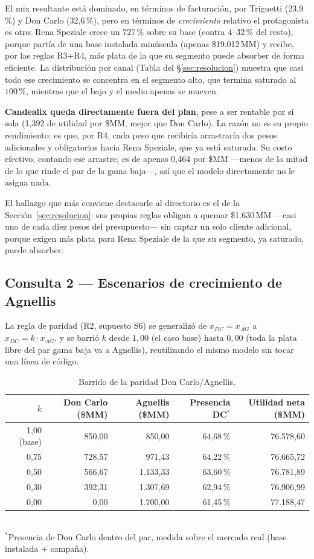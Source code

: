 \documentclass[10pt,a4paper]{article}
\begin{document}
El mix resultante está dominado, en términos de facturación, por Triguetti
(23,9\,\%) y Don Carlo (32,6\,\%), pero en términos de \emph{crecimiento}
relativo el protagonista es otro: Rena Speziale crece un $727\,\%$ sobre su
base (contra $4$--$32\,\%$ del resto), porque partía de una base instalada
minúscula (apenas \$19.012\,MM) y recibe, por las reglas R3+R4, más plata de
la que su segmento puede absorber de forma eficiente. La distribución por
canal (Tabla del \S\ref{sec:resolucion}) muestra que casi todo ese crecimiento
se concentra en el segmento alto, que termina saturado al $100\,\%$, mientras
que el bajo y el medio apenas se mueven.

\textbf{Candealix queda directamente fuera del plan}, pese a ser rentable por
sí sola (1,392 de utilidad por \$MM, mejor que Don Carlo). La razón no es su
propio rendimiento: es que, por R4, cada peso que recibiría arrastraría dos
pesos adicionales y obligatorios hacia Rena Speziale, que ya está saturada.
Su costo efectivo, contando ese arrastre, es de apenas 0,464 por \$MM —menos
de la mitad de lo que rinde el par de la gama baja—, así que el modelo
directamente no le asigna nada.

El hallazgo que más conviene destacarle al directorio es el de la
Sección~\ref{sec:resolucion}: sus propias reglas obligan a quemar
\$1.630\,MM —casi uno de cada diez pesos del presupuesto— sin captar un solo
cliente adicional, porque exigen más plata para Rena Speziale de la que su
segmento, ya saturado, puede absorber.

\subsection{Consulta 2 — Escenarios de crecimiento de Agnellis}
\label{sec:consulta2}

La regla de paridad (R2, supuesto S6) se generalizó de $x_{DC}=x_{AG}$ a
$x_{DC}=k\cdot x_{AG}$, y se barrió $k$ desde $1{,}00$ (el caso base) hasta
$0{,}00$ (toda la plata libre del par gama baja va a Agnellis), reutilizando
el mismo modelo sin tocar una línea de código.

\begin{table}[htbp]
\centering\small
\caption{Barrido de la paridad Don Carlo/Agnellis.}
\begin{tabular}{rrrrr}
\toprule
$k$ & Don Carlo (\$MM) & Agnellis (\$MM) & Presencia DC$^{*}$ & Utilidad neta (\$MM) \\
\midrule
1,00 (base) & 850,00 & 850,00   & 64{,}68\,\% & 76.578,60 \\
0,75        & 728,57 & 971,43   & 64{,}22\,\% & 76.665,72 \\
0,50        & 566,67 & 1.133,33 & 63{,}60\,\% & 76.781,89 \\
0,30        & 392,31 & 1.307,69 & 62{,}94\,\% & 76.906,99 \\
0,00        & 0,00   & 1.700,00 & 61{,}45\,\% & 77.188,47 \\
\bottomrule
\end{tabular}
\vspace{1mm}\\
\footnotesize$^{*}$Presencia de Don Carlo dentro del par, medida sobre el
mercado real (base instalada + campaña).
\end{table}
\end{document}

